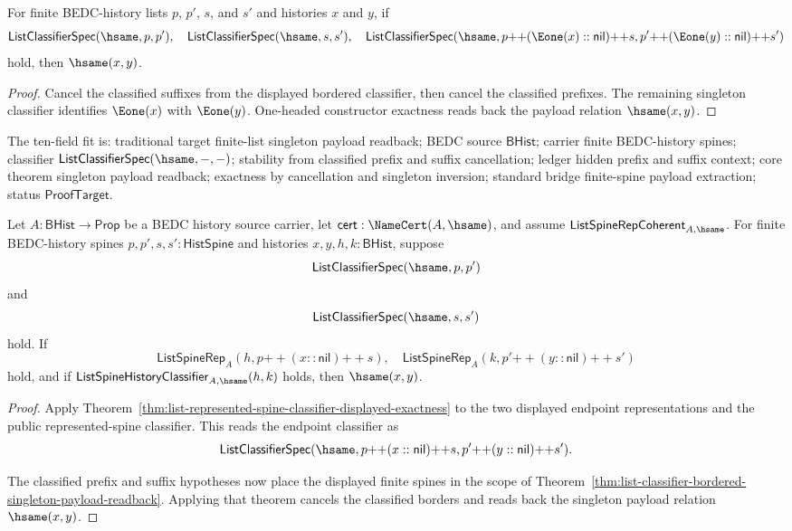 \begin{theorem}
\label{thm:list-classifier-bordered-e1-singleton-payload-readback}
For finite BEDC-history lists $p$, $p'$, $s$, and $s'$ and histories $x$ and
$y$, if
$$
\mathsf{ListClassifierSpec}(\hsame,p,p'),
\quad
\mathsf{ListClassifierSpec}(\hsame,s,s'),
\quad
\mathsf{ListClassifierSpec}(\hsame,p{++}(\Eone(x)::\mathsf{nil}){++}s,
p'{++}(\Eone(y)::\mathsf{nil}){++}s')
$$
hold, then $\hsame(x,y)$.
\end{theorem}
\begin{proof}
Cancel the classified suffixes from the displayed bordered classifier, then
cancel the classified prefixes. The remaining singleton classifier identifies
$\Eone(x)$ with $\Eone(y)$. One-headed constructor exactness reads back
the payload relation $\hsame(x,y)$.
\end{proof}

The ten-field fit is: traditional target finite-list singleton payload
readback; BEDC source $\mathsf{BHist}$; carrier finite BEDC-history spines;
classifier $\mathsf{ListClassifierSpec}(\hsame,-,-)$; stability from classified
prefix and suffix cancellation; ledger hidden prefix and suffix context; core
theorem singleton payload readback; exactness by cancellation and singleton
inversion; standard bridge finite-spine payload extraction; status
$\mathsf{ProofTarget}$.

\begin{theorem}
\label{thm:list-represented-spine-bordered-singleton-payload-readback}
Let $A:\mathsf{BHist}\to\mathsf{Prop}$ be a BEDC history source carrier, let
$\mathsf{cert}:\NameCert(A,\hsame)$, and assume
$\mathsf{ListSpineRepCoherent}_{A,\hsame}$. For finite BEDC-history spines
$p,p',s,s':\mathsf{HistSpine}$ and histories $x,y,h,k:\mathsf{BHist}$, suppose
$$
\mathsf{ListClassifierSpec}(\hsame,p,p')
$$
and
$$
\mathsf{ListClassifierSpec}(\hsame,s,s')
$$
hold. If
$$
\mathsf{ListSpineRep}_A(h,p{++}(x::\mathsf{nil}){++}s),
\quad
\mathsf{ListSpineRep}_A(k,p'{++}(y::\mathsf{nil}){++}s')
$$
hold, and if $\mathsf{ListSpineHistoryClassifier}_{A,\hsame}(h,k)$ holds, then
$\hsame(x,y)$.
\end{theorem}
\begin{proof}
Apply Theorem~\ref{thm:list-represented-spine-classifier-displayed-exactness}
to the two displayed endpoint representations and the public represented-spine
classifier. This reads the endpoint classifier as
$$
\mathsf{ListClassifierSpec}(\hsame,
p{++}(x::\mathsf{nil}){++}s,
p'{++}(y::\mathsf{nil}){++}s').
$$

The classified prefix and suffix hypotheses now place the displayed finite
spines in the scope of
Theorem~\ref{thm:list-classifier-bordered-singleton-payload-readback}. Applying
that theorem cancels the classified borders and reads back the singleton
payload relation $\hsame(x,y)$.
\end{proof}

